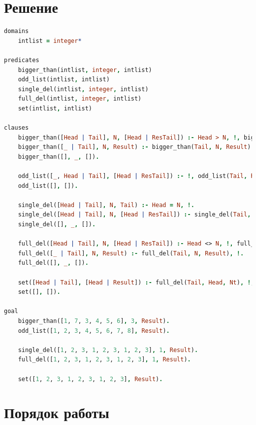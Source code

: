 \documentclass[12pt]{report}
\begin{document}
\newpage
\section*{Решение}

\begin{lstlisting}[language=prolog]
domains
	intlist = integer*

predicates
	bigger_than(intlist, integer, intlist)
	odd_list(intlist, intlist)
	single_del(intlist, integer, intlist)
	full_del(intlist, integer, intlist)
	set(intlist, intlist)

clauses
	bigger_than([Head | Tail], N, [Head | ResTail]) :- Head > N, !, bigger_than(Tail, N, ResTail).
	bigger_than([_ | Tail], N, Result) :- bigger_than(Tail, N, Result).
	bigger_than([], _, []).
	
	odd_list([_, Head | Tail], [Head | ResTail]) :- !, odd_list(Tail, ResTail).
	odd_list([], []).
	
	single_del([Head | Tail], N, Tail) :- Head = N, !.
	single_del([Head | Tail], N, [Head | ResTail]) :- single_del(Tail, N, ResTail), !.
	single_del([], _, []).
	
	full_del([Head | Tail], N, [Head | ResTail]) :- Head <> N, !, full_del(Tail, N, ResTail).
	full_del([_ | Tail], N, Result) :- full_del(Tail, N, Result), !.
	full_del([], _, []).
	
	set([Head | Tail], [Head | Result]) :- full_del(Tail, Head, Nt), !, set(Nt, Result).
	set([], []).

goal
	bigger_than([1, 7, 3, 4, 5, 6], 3, Result).
	odd_list([1, 2, 3, 4, 5, 6, 7, 8], Result).
	
	single_del([1, 2, 3, 1, 2, 3, 1, 2, 3], 1, Result).
	full_del([1, 2, 3, 1, 2, 3, 1, 2, 3], 1, Result).
	
	set([1, 2, 3, 1, 2, 3, 1, 2, 3], Result).
\end{lstlisting}

\section*{Порядок работы}
\end{document}
